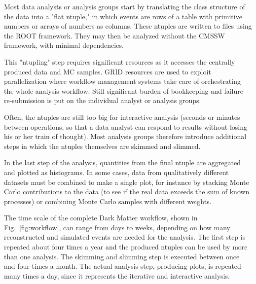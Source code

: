 \documentclass[a4paper]{jpconf}
\begin{document}
Most data analysts or analysis groups start by translating the class structure of the data into a "flat ntuple," in which events are rows of a table with primitive numbers or arrays of numbers as columns. These ntuples are written to files using the ROOT framework. They may then be analyzed without the CMSSW framework, with minimal dependencies.

This "ntupling" step requires significant resources as it accesses the centrally produced data and MC samples. GRID resources are used to exploit parallelization where workflow management systems take care of orchestrating the whole analysis workflow. Still significant burden of bookkeeping and failure re-submission is put on the individual analyst or analysis groups. 

Often, the ntuples are still too big for interactive analysis (seconds or minutes between operations, so that a data analyst can respond to results without losing his or her train of thought). Most analysis groups therefore introduce additional steps in which the ntuples themselves are skimmed and slimmed.

In the last step of the analysis, quantities from the final ntuple are aggregated and plotted as histograms. In some cases, data from qualitatively different datasets must be combined to make a single plot, for instance by stacking Monte Carlo contributions to the data (to see if the real data exceeds the sum of known processes) or combining Monte Carlo samples with different weights.

The time scale of the complete Dark Matter workflow, shown in Fig.~\ref{fig:workflow}, can range from days to weeks, depending on how many reconstructed and simulated events are needed for the analysis. The first step is repeated about four times a year and the produced ntuples can be used by more than one analysis. The skimming and slimming step is executed between once and four times a month. The actual analysis step, producing plots, is repeated many times a day, since it represents the iterative and interactive analysis.
\end{document}

